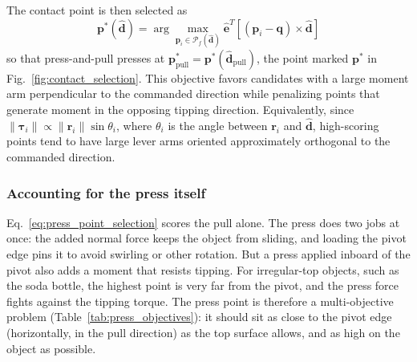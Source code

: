 \documentclass[10pt, conference]{IEEEtran}
\begin{document}
The contact point is then selected as
\begin{equation}
    \boxed{
    \mathbf p^*(\hat{\mathbf d})
    =
    \arg\max_{\mathbf p_i \in \mathcal{P}_f(\hat{\mathbf d})}
    \hat{\mathbf e}^{T}
    \left[
    \left(
    \mathbf p_i - \mathbf q
    \right)
    \times
    \hat{\mathbf d}
    \right]
    }
    \label{eq:press_point_selection}
\end{equation}
so that press-and-pull presses at $\mathbf p^*_{\mathrm{pull}} = \mathbf p^*(\hat{\mathbf d}_{\mathrm{pull}})$, the point marked $\mathbf p^*$ in Fig.~\ref{fig:contact_selection}. This objective favors candidates with a large moment arm perpendicular to the commanded direction while penalizing points that generate moment in the opposing tipping direction. Equivalently, since $\|\boldsymbol{\tau}_i\| \propto \|\mathbf r_i\|\sin\theta_i$, where $\theta_i$ is the angle between $\mathbf r_i$ and $\hat{\mathbf d}$, high-scoring points tend to have large lever arms oriented approximately orthogonal to the commanded direction.

\subsubsection{Accounting for the press itself}
\label{sec:press_demand}
Eq.~\eqref{eq:press_point_selection} scores the pull alone. The press does two jobs at once: the added normal force keeps the object from sliding, and loading the pivot edge pins it to avoid swirling or other rotation. But a press applied inboard of the pivot also adds a moment that resists tipping. For irregular-top objects, such as the soda bottle, the highest point is very far from the pivot, and the press force fights against the tipping torque. The press point is therefore a multi-objective problem (Table~\ref{tab:press_objectives}): it should sit as close to the pivot edge (horizontally, in the pull direction) as the top surface allows, and as high on the object as possible.
\end{document}

